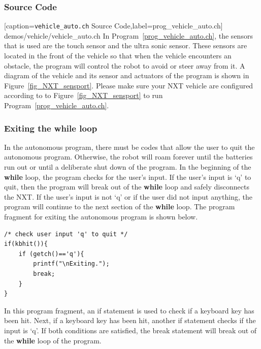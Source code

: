 \documentclass[11pt]{article}
\begin{document}
\subsubsection*{Source Code}

[caption={{\tt vehicle\_auto.ch} Source Code},label=prog_vehicle_auto.ch]
{demos/vehicle/vehicle_auto.ch}
In Program~\ref{prog_vehicle_auto.ch}, the sensors that is used are the touch 
sensor and the ultra sonic sensor. These sensors are located in the front of 
the vehicle so that when the vehicle encounters an obstacle, the program will
control the robot to avoid or steer away from it. A diagram of the vehicle and 
its sensor and actuators of the program is shown in Figure~\ref{fig_NXT_sensport}. 
Please make sure your NXT vehicle are configured according to to 
Figure~\ref{fig_NXT_sensport} to run Program~\ref{prog_vehicle_auto.ch}.

\subsubsection*{Exiting the while loop}
In the autonomous program, there must be codes that allow the user to quit the 
autonomous program. Otherwise, the robot will roam forever until the batteries 
run out or until a deliberate shut down of the program. In the beginning of the 
{\bf while} loop, the program checks for the user's input. If the user's input 
is `q' to quit, then the program will break out of the {\bf while} loop and 
safely disconnects the NXT. If the user's input is not `q' or if the user did 
not input anything, the program will continue to the next section of the 
{\bf while} loop. The program fragment for exiting the autonomous program is 
shown below.
\begin{lstlisting}
/* check user input 'q' to quit */
if(kbhit()){
    if (getch()=='q'){	
        printf("\nExiting.");
        break;
    }
}
\end{lstlisting}
In this program fragment, an if statement is used to check if a keyboard key has 
been hit. Next, if a keyboard key has been hit, another if statement checks if 
the input is `q'. If both conditions are satisfied, the break statement will break 
out of the {\bf while} loop of the program.
\end{document}
